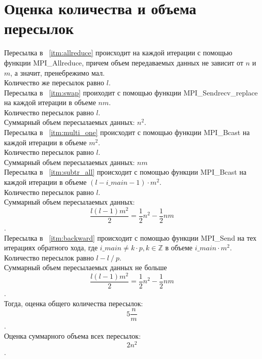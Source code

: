 \documentclass[11pt]{article}
\begin{document}
\section{Оценка количества и объема пересылок}
Пересылка в ~\ref{itm:allreduce} происходит на каждой итерации с помощью функции MPI\_Allreduce, причем объем передаваемых данных не зависит от $n$ и  $m$, а значит, пренебрежимо мал. 
\\
Количество же пересылок равно $l$.
\\
Пересылка в ~\ref{itm:swap} проиходит с помощью функции MPI\_Sendrecv\_replace на каждой итерации в объеме $nm$. 
\\
Количество пересылок равно $l$. 
\\
Суммарный объем пересылаемых данных: $n^2$.
\\
Пересылка в ~\ref{itm:multi_one} происходит с помощью функции MPI\_Bcast на каждой итерации в объеме $m^2$. 
\\
Количество пересылок равно $l$. 
\\
Суммарный объем пересылаемых данных: $nm$
\\
Пересылка в ~\ref{itm:subtr_all} происходит с помощью функции MPI\_Bcast на каждой итерации в объеме $(l - i\_main - 1) \cdot m^2$. 
\\
Количество пересылок равно $l$. 
\\
Суммарный объем пересылаемых данных: $$\frac{l(l-1)m^2}{2} = \frac{1}{2}n^2 - \frac{1}{2}nm$$.
\\
Пересылка в ~\ref{itm:backward} происходит с помощью функции MPI\_Send на тех итерациях обратного хода, где $i\_main \neq k\cdot p, k\in \mathbb{Z}$ в объеме $i\_main \cdot m^2$. 
\\
Количество пересылок равно $l - l\ /\ p$. 
\\
Суммарный объем пересылаемых данных не больше $$\frac{l(l-1)m^2}{2} = \frac{1}{2}n^2 - \frac{1}{2}nm$$.
\\
Тогда, оценка общего количества пересылок: $$5\frac{n}{m}$$.
\\
Оценка суммарного объема всех пересылок: $$2n^2$$.
\end{document}
